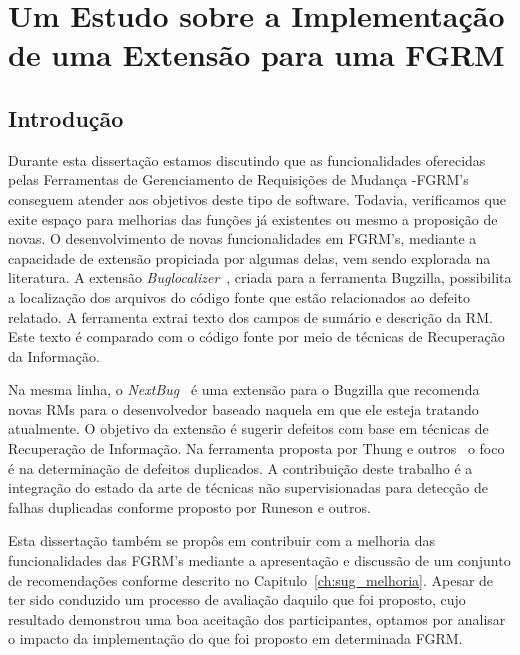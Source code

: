 \chapter{Um Estudo sobre a Implementação de uma Extensão para uma FGRM}
\label{ch:implemtacao_extensao}

\section{Introdução}
\label{sec:implemtacao_extensao_intro}

Durante esta dissertação estamos discutindo que as funcionalidades oferecidas
pelas Ferramentas de Gerenciamento de Requisições de Mudança \@-\@ FGRM's
conseguem atender aos objetivos deste tipo de software. Todavia, verificamos que
exite espaço para melhorias das funções já existentes ou mesmo a proposição de
novas. O desenvolvimento de novas funcionalidades em FGRM's, mediante a
capacidade de extensão propiciada por algumas delas, vem sendo explorada na
literatura. A extensão
\textit{Buglocalizer}~\cite{Thung:2014:BIT:2635868.2661678}, criada para a
ferramenta Bugzilla, possibilita a localização dos arquivos do código fonte que
estão relacionados ao defeito relatado. A ferramenta extrai texto dos campos de
sumário e descrição da RM\@. Este texto é comparado com o código fonte por meio
de técnicas de Recuperação da Informação.

Na mesma linha, o \textit{NextBug}~\cite{101186} é uma extensão para o Bugzilla
que recomenda novas RMs para o desenvolvedor baseado naquela em que ele esteja
tratando atualmente. O objetivo da extensão é sugerir defeitos com base em
técnicas de Recuperação de Informação. Na ferramenta proposta por Thung e
outros~\cite{Thung:2014:DIT:2642937.2648627} o foco é na determinação de
defeitos duplicados. A contribuição deste trabalho é a integração do estado da
arte de técnicas não supervisionadas para detecção de falhas duplicadas conforme
proposto por Runeson e outros.

Esta dissertação também se propôs em contribuir com a melhoria das
funcionalidades das FGRM's mediante a apresentação e discussão de um conjunto de
recomendações conforme descrito no Capitulo~\ref{ch:sug_melhoria}. Apesar de ter
sido conduzido um processo de avaliação daquilo que foi proposto, cujo resultado
demonstrou uma boa aceitação dos participantes, optamos por analisar o impacto
da implementação do que foi proposto em determinada FGRM\@.

